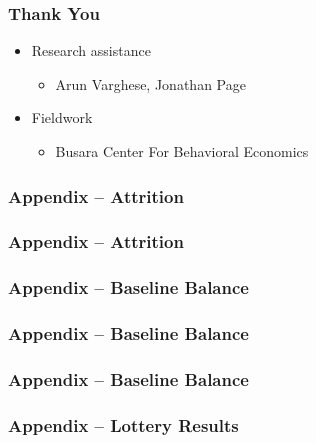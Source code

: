 \documentclass{beamer}
\begin{document}
\begin{frame} \frametitle{Thank You}

	\begin{itemize}
	\item Research assistance
		\begin{itemize}
		\item Arun Varghese, Jonathan Page
		\end{itemize}
	\item Fieldwork
		\begin{itemize}	
		\item Busara Center For Behavioral Economics
		\end{itemize}
	\end{itemize}
\end{frame}

\appendix

\begin{frame} \frametitle{Appendix -- Attrition}
	
	

\end{frame}

\begin{frame} \frametitle{Appendix -- Attrition}
	
	

\end{frame}

\begin{frame} \frametitle{Appendix -- Baseline Balance}

		

\end{frame}

\begin{frame} \frametitle{Appendix -- Baseline Balance}

		

\end{frame}

\begin{frame} \frametitle{Appendix -- Baseline Balance}

		

\end{frame}

\begin{frame} \frametitle{Appendix -- Lottery Results}

	

\end{frame}
\end{document}
